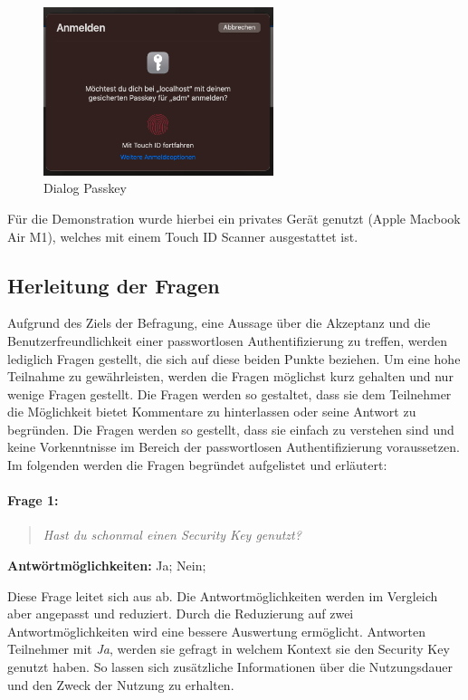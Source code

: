 \begin{figure}[H]
	\centering 
	\includegraphics[width=0.6\textwidth]{img/abbildungen/passkey_demo.png}
	\captionsetup{format=hang}
	\caption{Dialog Passkey}
\end{figure}

Für die Demonstration wurde hierbei ein privates Gerät genutzt (Apple Macbook Air M1), welches mit einem Touch ID Scanner ausgestattet ist.


\subsection{Herleitung der Fragen} \label{questions}
Aufgrund des Ziels der Befragung, eine Aussage über die Akzeptanz und die Benutzerfreundlichkeit einer passwortlosen Authentifizierung zu treffen, werden lediglich Fragen gestellt, die sich auf diese beiden Punkte beziehen. Um eine hohe Teilnahme zu gewährleisten, werden die Fragen möglichst kurz gehalten und nur wenige Fragen gestellt. Die Fragen werden so gestaltet, dass sie dem Teilnehmer die Möglichkeit bietet Kommentare zu hinterlassen oder seine Antwort zu begründen. Die Fragen werden so gestellt, dass sie einfach zu verstehen sind und keine Vorkenntnisse im Bereich der passwortlosen Authentifizierung voraussetzen. Im folgenden werden die Fragen begründet aufgelistet und erläutert:

\paragraph{Frage 1:}

\begin{quote}
    \textit{Hast du schonmal einen Security Key genutzt?}
\end{quote}
\textbf{Antwörtmöglichkeiten:} Ja; Nein; 

Diese Frage leitet sich aus \cite{farke2020you} ab. Die Antwortmöglichkeiten werden im Vergleich aber angepasst und reduziert. Durch die Reduzierung auf zwei Antwortmöglichkeiten wird eine bessere Auswertung ermöglicht. Antworten Teilnehmer mit \textit{Ja}, werden sie gefragt in welchem Kontext sie den Security Key genutzt haben. So lassen sich zusätzliche Informationen über die Nutzungsdauer und den Zweck der Nutzung zu erhalten.

